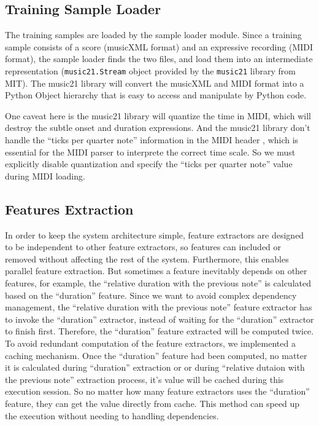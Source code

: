 
\subsection{Training Sample Loader}
   The training samples are loaded by the sample loader module. Since a training sample  consists of a score (musicXML format) and an expressive recording (MIDI format), the sample loader finds the two files, and load them into an intermediate representation (\texttt{music21.Stream} object provided by the \texttt{music21} library \cite{music21} from MIT). The music21 library will convert the musicXML and MIDI format into a Python Object hierarchy that is easy to access and manipulate by Python code. 

   One caveat here is the music21 library will quantize the time in MIDI, which will destroy the subtle onset and duration expressions. And the music21 library don't handle the \enquote{ticks per quarter note} information in the MIDI header \cite{midispec}, which is essential for the MIDI parser to interprete the correct time scale. So we must explicitly disable quantization and specify the \enquote{ticks per quarter note} value during MIDI loading.

\subsection{Features Extraction}
In order to keep the system architecture simple, feature extractors are designed to be independent to other feature extractors, so features can included or removed without affecting the rest of the system. Furthermore, this enables parallel feature extraction. But sometimes a feature inevitably depends on other features, for example, the \enquote{relative duration with the previous note} is calculated based on the \enquote{duration} feature. Since we want to avoid complex dependency management, the \enquote{relative duration with the previous note} feature extractor has to invoke the \enquote{duration} extractor, instead of waiting for the \enquote{duration} extractor to finish first. Therefore, the \enquote{duration} feature extracted will be computed twice. To avoid redundant computation of the feature extractors, we implemented a caching mechanism. Once the \enquote{duration} feature had been computed, no matter it is calculated during \enquote{duration} extraction or or during \enquote{relative dutaion with the previous note} extraction process, it's value will be cached during this execution session. So no matter how many feature extractors uses the \enquote{duration} feature, they can get the value directly from cache. This method can speed up the execution without needing to handling dependencies.

